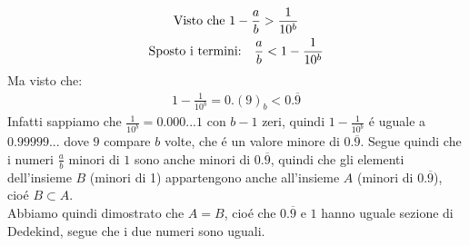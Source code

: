 \documentclass[twoside]{article} %
\begin{document}
	\begin{gather*}
		\text{Visto che }1-\frac{a}{b}>\frac{1}{10^b}\\
		\text{Sposto i termini:\quad } \frac{a}{b}<1-\frac{1}{10^b}
	\end{gather*} 
	Ma visto che:
	\begin{gather*}
		1-\frac{1}{10^b}=0.(9)_b<0.\overline{9}
	\end{gather*}	
	Infatti sappiamo che $\frac{1}{10^b}=0.000...1$ con $b-1$ zeri, quindi $1-\frac{1}{10^b}$ \'e uguale a $0.99999...$ dove $9$ compare $b$ volte, che \'e un valore minore di $0.\overline{9}$. Segue quindi che i numeri $\frac{a}{b}$ minori di $1$ sono anche minori di $0.\overline{9}$, quindi che gli elementi dell'insieme $B$ (minori di 1) appartengono anche all'insieme $A$ (minori di $0.\overline{9}$), cio\'e $B\subset A$.\\
	Abbiamo quindi dimostrato che $A=B$, cio\'e che $0.\overline{9}$ e $1$ hanno uguale sezione di Dedekind, segue che i due numeri sono uguali.
	\newpage
\end{document}
